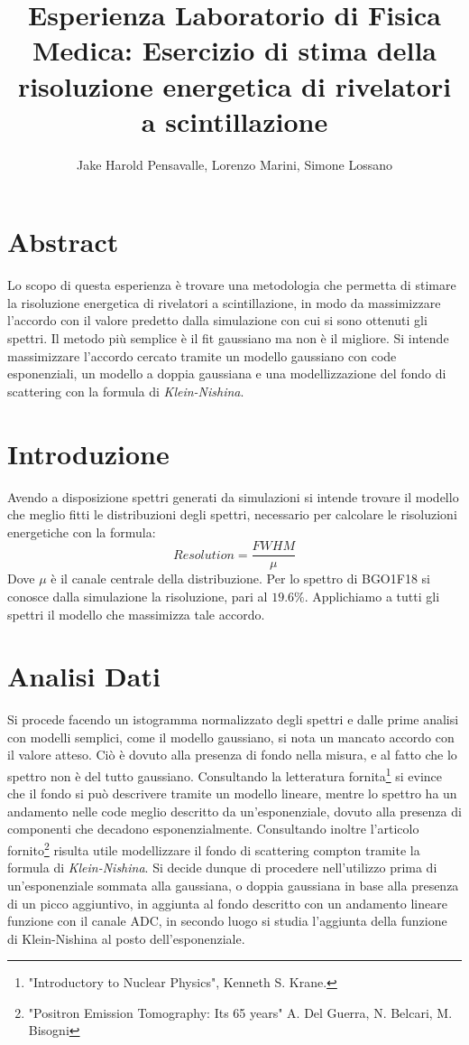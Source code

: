 \documentclass[a4paper]{article}
\title{Esperienza Laboratorio di Fisica Medica: Esercizio di stima della risoluzione energetica di rivelatori a scintillazione}
\author{Jake Harold Pensavalle, Lorenzo Marini, Simone Lossano}
\begin{document}
	\maketitle
	\newpage
	\tableofcontents
	\newpage
\section{Abstract}
Lo scopo di questa esperienza è trovare una metodologia che permetta di stimare la risoluzione energetica di rivelatori a scintillazione, in modo da massimizzare l'accordo con il valore predetto dalla simulazione con cui si sono ottenuti gli spettri. Il metodo più semplice è il fit gaussiano ma non è il migliore. Si intende massimizzare l'accordo cercato tramite un modello gaussiano con code esponenziali, un modello a doppia gaussiana e una modellizzazione del fondo di scattering con la formula di \textit{Klein-Nishina}.
\section{Introduzione}
Avendo a disposizione spettri generati da simulazioni si intende trovare il modello che meglio fitti le distribuzioni degli spettri, necessario per calcolare le risoluzioni energetiche con la formula:
\begin{equation}
Resolution=\frac{FWHM}{\mu}
\end{equation}
Dove $\mu$ è il canale centrale della distribuzione. Per lo spettro di BGO1F18 si conosce dalla simulazione la risoluzione, pari al $19.6\%$. Applichiamo a tutti gli spettri il modello che massimizza tale accordo.
\section{Analisi Dati}
Si procede facendo un istogramma normalizzato degli spettri e dalle prime analisi con modelli semplici, come il modello gaussiano, si nota un mancato accordo con il valore atteso. Ciò è dovuto alla presenza di fondo nella misura, e al fatto che lo spettro non è del tutto gaussiano. Consultando la letteratura fornita\footnote{\label{note1}"Introductory to Nuclear Physics", Kenneth S. Krane.} si evince che il fondo si può descrivere tramite un modello lineare, mentre lo spettro ha un andamento nelle code meglio descritto da un'esponenziale, dovuto alla presenza di componenti che decadono esponenzialmente. Consultando inoltre l'articolo fornito\footnote{\label{note2}"Positron Emission Tomography: Its 65 years"
A. Del Guerra, N. Belcari, M. Bisogni} risulta utile modellizzare il fondo di scattering compton tramite la formula di \textit{Klein-Nishina}.
Si decide dunque di procedere nell'utilizzo prima di un'esponenziale sommata alla gaussiana, o doppia gaussiana in base alla presenza di un picco aggiuntivo, in aggiunta al fondo descritto con un andamento lineare funzione con il canale ADC, in secondo luogo si studia l'aggiunta della funzione di Klein-Nishina al posto dell'esponenziale.
\end{document}
